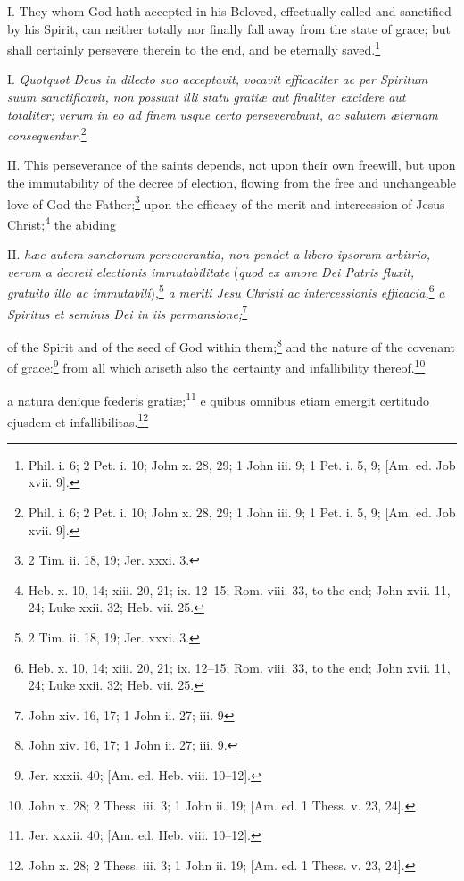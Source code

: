 I. They whom God hath accepted in his Beloved, effectually called and sanctified by his Spirit, can neither totally nor finally fall away from the state of grace; but shall certainly persevere therein to the end, and be eternally saved.\footnote{Phil. i. 6; 2 Pet. i. 10; John x. 28, 29; 1 John iii. 9; 1 Pet. i. 5, 9; [Am. ed. Job xvii. 9].}

I. \emph{Quotquot Deus in dilecto suo acceptavit, vocavit efficaciter ac per Spiritum suum sanctificavit, non possunt illi statu gratiæ aut finaliter excidere aut totaliter; verum in eo ad finem usque certo perseverabunt, ac salutem æternam consequentur.}\footnote{Phil. i. 6; 2 Pet. i. 10; John x. 28, 29; 1 John iii. 9; 1 Pet. i. 5, 9; [Am. ed. Job xvii. 9].}

II. This perseverance of the saints depends, not upon their own freewill, but upon the immutability of the decree of election, flowing from the free and unchangeable love of God the Father;\footnote{2 Tim. ii. 18, 19; Jer. xxxi. 3.} upon the efficacy of the merit and intercession of Jesus Christ;\footnote{Heb. x. 10, 14; xiii. 20, 21; ix. 12–15; Rom. viii. 33, to the end; John xvii. 11, 24; Luke xxii. 32; Heb. vii. 25.} the abiding

II. \emph{hæc autem sanctorum perseverantia, non pendet a libero ipsorum arbitrio, verum a decreti electionis immutabilitate} (\emph{quod ex amore Dei Patris fluxit, gratuito illo ac immutabili}),\footnote{2 Tim. ii. 18, 19; Jer. xxxi. 3.}\emph{ a meriti Jesu Christi ac intercessionis efficacia,}\footnote{Heb. x. 10, 14; xiii. 20, 21; ix. 12–15; Rom. viii. 33, to the end; John xvii. 11, 24; Luke xxii. 32; Heb. vii. 25.}\emph{ a Spiritus et seminis Dei in iis permansione;}\footnote{John xiv. 16, 17; 1 John ii. 27; iii. 9}

of the Spirit and of the seed of God within them;\footnote{John xiv. 16, 17; 1 John ii. 27; iii. 9.} and the nature of the covenant of grace:\footnote{Jer. xxxii. 40; [Am. ed. Heb. viii. 10–12].} from all which ariseth also the certainty and infallibility thereof.\footnote{John x. 28; 2 Thess. iii. 3; 1 John ii. 19; [Am. ed. 1 Thess. v. 23, 24].}

a natura denique fœderis gratiæ;\footnote{Jer. xxxii. 40; [Am. ed. Heb. viii. 10–12].} e quibus omnibus etiam emergit certitudo ejusdem et infallibilitas.\footnote{John x. 28; 2 Thess. iii. 3; 1 John ii. 19; [Am. ed. 1 Thess. v. 23, 24].}

